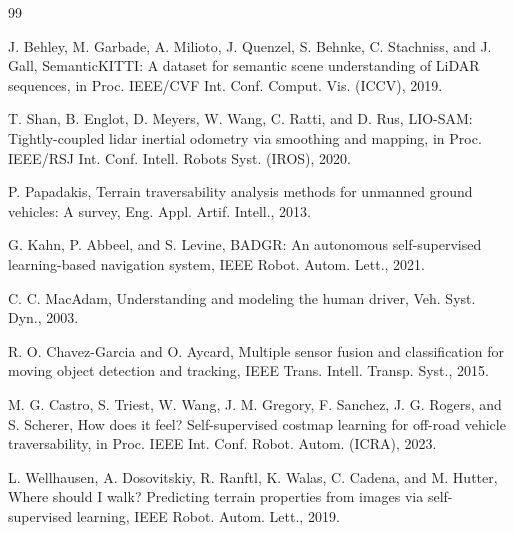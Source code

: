 \documentclass[letterpaper, 10 pt, conference]{ieeeconf}  %
\begin{document}



\begin{thebibliography}{99}

 J. Behley, M. Garbade, A. Milioto, J. Quenzel, S. Behnke, C. Stachniss, and J. Gall, SemanticKITTI: A dataset for semantic scene understanding of LiDAR sequences, in Proc. IEEE/CVF Int. Conf. Comput. Vis. (ICCV), 2019.

 T. Shan, B. Englot, D. Meyers, W. Wang, C. Ratti, and D. Rus, LIO-SAM: Tightly-coupled lidar inertial odometry via smoothing and mapping, in Proc. IEEE/RSJ Int. Conf. Intell. Robots Syst. (IROS), 2020.

 P. Papadakis, Terrain traversability analysis methods for unmanned ground vehicles: A survey, Eng. Appl. Artif. Intell., 2013.

 G. Kahn, P. Abbeel, and S. Levine, BADGR: An autonomous self-supervised learning-based navigation system, IEEE Robot. Autom. Lett., 2021.

 C. C. MacAdam, Understanding and modeling the human driver, Veh. Syst. Dyn., 2003.

 R. O. Chavez-Garcia and O. Aycard, Multiple sensor fusion and classification for moving object detection and tracking, IEEE Trans. Intell. Transp. Syst., 2015.

 M. G. Castro, S. Triest, W. Wang, J. M. Gregory, F. Sanchez, J. G. Rogers, and S. Scherer, How does it feel? Self-supervised costmap learning for off-road vehicle traversability, in Proc. IEEE Int. Conf. Robot. Autom. (ICRA), 2023.

 L. Wellhausen, A. Dosovitskiy, R. Ranftl, K. Walas, C. Cadena, and M. Hutter, Where should I walk? Predicting terrain properties from images via self-supervised learning, IEEE Robot. Autom. Lett., 2019.


\end{thebibliography}
\end{document}
